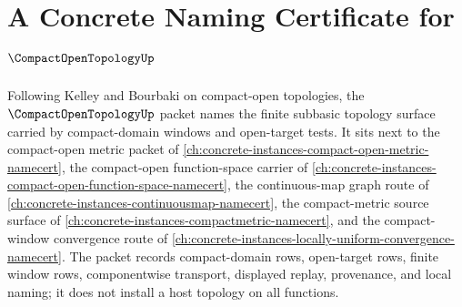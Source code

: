\chapter{A Concrete Naming Certificate for $\CompactOpenTopologyUp$}
\label{ch:concrete-instances-compact-open-topology-namecert}

Following Kelley and Bourbaki on compact-open topologies, the $\CompactOpenTopologyUp$ packet names the finite subbasic topology surface carried by compact-domain windows and open-target tests. It sits next to the compact-open metric packet of \autoref{ch:concrete-instances-compact-open-metric-namecert}, the compact-open function-space carrier of \autoref{ch:concrete-instances-compact-open-function-space-namecert}, the continuous-map graph route of \autoref{ch:concrete-instances-continuousmap-namecert}, the compact-metric source surface of \autoref{ch:concrete-instances-compactmetric-namecert}, and the compact-window convergence route of \autoref{ch:concrete-instances-locally-uniform-convergence-namecert}. The packet records compact-domain rows, open-target rows, finite window rows, componentwise transport, displayed replay, provenance, and local naming; it does not install a host topology on all functions.

